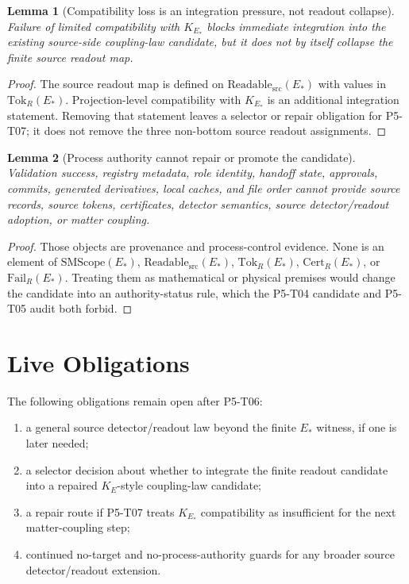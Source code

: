 \documentclass[11pt]{article}
\newcommand{\EStar}{E_{\ast}}
\newcommand{\SMScope}{\mathrm{SMScope}}
\newcommand{\ReadableSrc}{\mathrm{Readable}_{\mathrm{src}}}
\newcommand{\TokR}{\mathrm{Tok}_{R}}
\newcommand{\CertR}{\mathrm{Cert}_{R}}
\newcommand{\FailR}{\mathrm{Fail}_{R}}
\newtheorem{lemma}{Lemma}
\begin{document}
\begin{lemma}[Compatibility loss is an integration pressure, not readout collapse]
Failure of limited compatibility with \(K_{E_{\ast}}\) blocks immediate
integration into the existing source-side coupling-law candidate, but it does
not by itself collapse the finite source readout map.
\end{lemma}

\begin{proof}
The source readout map is defined on \(\ReadableSrc(\EStar)\) with values in
\(\TokR(\EStar)\). Projection-level compatibility with \(K_{E_{\ast}}\) is an
additional integration statement. Removing that statement leaves a selector
or repair obligation for P5-T07; it does not remove the three non-bottom
source readout assignments.
\end{proof}

\begin{lemma}[Process authority cannot repair or promote the candidate]
Validation success, registry metadata, role identity, handoff state,
approvals, commits, generated derivatives, local caches, and file order
cannot provide source records, source tokens, certificates, detector
semantics, source detector/readout adoption, or matter coupling.
\end{lemma}

\begin{proof}
Those objects are provenance and process-control evidence. None is an element
of \(\SMScope(\EStar)\), \(\ReadableSrc(\EStar)\), \(\TokR(\EStar)\),
\(\CertR(\EStar)\), or \(\FailR(\EStar)\). Treating them as mathematical or
physical premises would change the candidate into an authority-status rule,
which the P5-T04 candidate and P5-T05 audit both forbid.
\end{proof}

\section{Live Obligations}

The following obligations remain open after P5-T06:

\begin{enumerate}[leftmargin=*]
  \item a general source detector/readout law beyond the finite
        \(\EStar\) witness, if one is later needed;
  \item a selector decision about whether to integrate the finite readout
        candidate into a repaired \(K_E\)-style coupling-law candidate;
  \item a repair route if P5-T07 treats \(K_{E_{\ast}}\) compatibility as
        insufficient for the next matter-coupling step;
  \item continued no-target and no-process-authority guards for any broader
        source detector/readout extension.
\end{enumerate}
\end{document}
